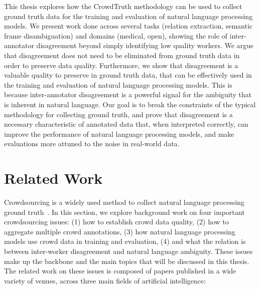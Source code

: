 This thesis explores how the CrowdTruth methodology can be used to collect ground truth data for the training and evaluation of natural language processing models. We present work done across several tasks (relation extraction, semantic frame disambiguation) and domains (medical, open), showing the role of inter-annotator disagreement beyond simply identifying low quality workers. We argue that disagreement does not need to be eliminated from ground truth data in order to preserve data quality. Furthermore, we show that disagreement is a valuable quality to preserve in ground truth data, that can be effectively used in the training and evaluation of natural language processing models. This is because inter-annotator disagreement is a powerful signal for the ambiguity that is inherent in natural language. Our goal is to break the constraints of the typical methodology for collecting ground truth, and prove that disagreement is a necessary characteristic of annotated data that, when interpreted correctly, can improve the performance of natural language processing models, and make evaluations more attuned to the noise in real-world data.


\section{Related Work}
\label{sec:intro-rel-work}

Crowdsourcing is a widely used method to collect natural language processing ground truth~\cite{Sabou:2012:CRO:2362456.2362479}. In this section, we explore background work on four important crowdsourcing issues: (1) how to establish crowd data quality, (2) how to aggregate multiple crowd annotations, (3) how natural language processing models use crowd data in training and evaluation, (4) and what the relation is between inter-worker disagreement and natural language ambiguity. These issues make up the backbone and the main topics that will be discussed in this thesis. The related work on these issues is composed of papers published in a wide variety of venues, across three main fields of artificial intelligence:   


